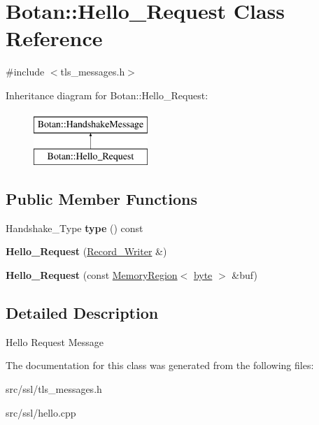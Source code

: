 \hypertarget{classBotan_1_1Hello__Request}{\section{Botan\-:\-:Hello\-\_\-\-Request Class Reference}
\label{classBotan_1_1Hello__Request}
}


{\ttfamily \#include $<$tls\-\_\-messages.\-h$>$}

Inheritance diagram for Botan\-:\-:Hello\-\_\-\-Request\-:\begin{figure}[H]
\begin{center}
\leavevmode
\includegraphics[height=2.000000cm]{classBotan_1_1Hello__Request}
\end{center}
\end{figure}
\subsection*{Public Member Functions}
\begin{DoxyCompactItemize}
\item 
\hypertarget{classBotan_1_1Hello__Request_ac73b210a64fcd65907271c24fa9427eb}{Handshake\-\_\-\-Type {\bfseries type} () const }\label{classBotan_1_1Hello__Request_ac73b210a64fcd65907271c24fa9427eb}

\item 
\hypertarget{classBotan_1_1Hello__Request_a03914f8851c11e77218e158bcc180d13}{{\bfseries Hello\-\_\-\-Request} (\hyperlink{classBotan_1_1Record__Writer}{Record\-\_\-\-Writer} \&)}\label{classBotan_1_1Hello__Request_a03914f8851c11e77218e158bcc180d13}

\item 
\hypertarget{classBotan_1_1Hello__Request_a540067abd655e9d26cb6b1d9eadca237}{{\bfseries Hello\-\_\-\-Request} (const \hyperlink{classBotan_1_1MemoryRegion}{Memory\-Region}$<$ \hyperlink{namespaceBotan_a7d793989d801281df48c6b19616b8b84}{byte} $>$ \&buf)}\label{classBotan_1_1Hello__Request_a540067abd655e9d26cb6b1d9eadca237}

\end{DoxyCompactItemize}


\subsection{Detailed Description}
Hello Request Message 

The documentation for this class was generated from the following files\-:\begin{DoxyCompactItemize}
\item 
src/ssl/tls\-\_\-messages.\-h\item 
src/ssl/hello.\-cpp\end{DoxyCompactItemize}
